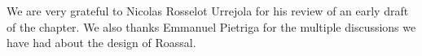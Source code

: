 \documentclass[a4paper,10pt,twoside]{book}
\begin{document}
We are very grateful to Nicolas Rosselot Urrejola for his review of an early draft of the chapter. We also thanks Emmanuel Pietriga for the multiple discussions we have had about the design of Roassal. 

%
%


\ifx\wholebook\relax\else
   
   
\end{document}

